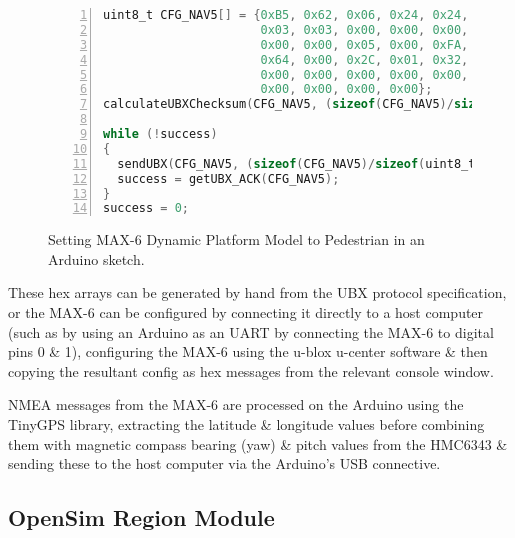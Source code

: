 \begin{figure}[h]
\begin{lstlisting}[language=C, numbers=left, numberstyle=\small, stepnumber=1, frame=single, breaklines=true, backgroundcolor=\color{codebackground}, showstringspaces=false]
uint8_t CFG_NAV5[] = {0xB5, 0x62, 0x06, 0x24, 0x24, 0x00, 0xFF, 0xFF,
                      0x03, 0x03, 0x00, 0x00, 0x00, 0x00, 0x10, 0x27,
                      0x00, 0x00, 0x05, 0x00, 0xFA, 0x00, 0xFA, 0x00,
                      0x64, 0x00, 0x2C, 0x01, 0x32, 0x3C, 0x00, 0x00,
                      0x00, 0x00, 0x00, 0x00, 0x00, 0x00, 0x00, 0x00,
                      0x00, 0x00, 0x00, 0x00};
calculateUBXChecksum(CFG_NAV5, (sizeof(CFG_NAV5)/sizeof(uint8_t)));

while (!success)
{
  sendUBX(CFG_NAV5, (sizeof(CFG_NAV5)/sizeof(uint8_t)));
  success = getUBX_ACK(CFG_NAV5);
}
success = 0;
\end{lstlisting}
\caption{Setting MAX-6 Dynamic Platform Model to Pedestrian in an Arduino sketch.}
\label{arduinoMAX6hex}
\end{figure}

These hex arrays can be generated by hand from the UBX protocol specification\maxProtocolFootnote{}, or the MAX-6 can be configured by connecting it directly to a host computer (such as by using an Arduino as an UART by connecting the MAX-6 to digital pins 0 \& 1), configuring the MAX-6 using the u-blox u-center software \& then copying the resultant config as hex messages from the relevant console window.

NMEA messages from the MAX-6 are processed on the Arduino using the TinyGPS library\tinygpsFootnote{}, extracting the latitude \& longitude values before combining them with magnetic compass bearing (yaw) \& pitch values from the HMC6343 \& sending these to the host computer via the Arduino's USB connective.


\subsection{OpenSim Region Module}

\label{regionModule}

\newcommand{\RegionModuleFootnote}{\footnote{\url{http://opensimulator.org/wiki/IRegionModule}}}

\newcommand{\RegionModuleCodeFootnote}{\footnote{\url{https://bitbucket.org/cj_davies/sharedregionmodulegpsavatar}}}


